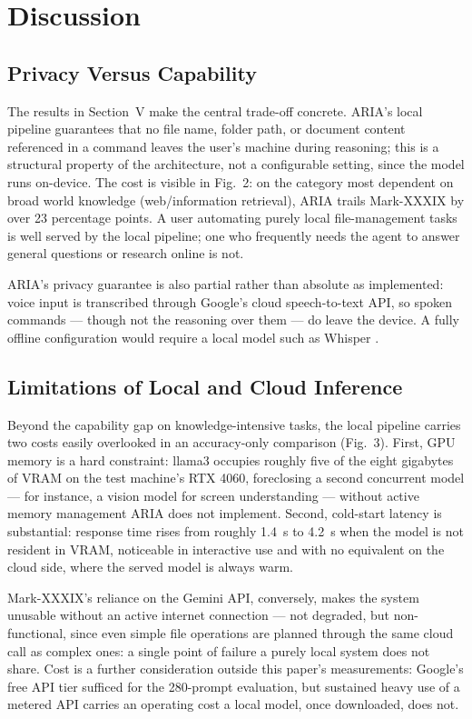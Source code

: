 \documentclass[conference]{IEEEtran}
\begin{document}
\section{Discussion}

\subsection{Privacy Versus Capability}

The results in Section~V make the central trade-off concrete. ARIA's local pipeline guarantees that no file name, folder path, or document content referenced in a command leaves the user's machine during reasoning; this is a structural property of the architecture, not a configurable setting, since the model runs on-device. The cost is visible in Fig.~2: on the category most dependent on broad world knowledge (web/information retrieval), ARIA trails Mark-XXXIX by over 23 percentage points. A user automating purely local file-management tasks is well served by the local pipeline; one who frequently needs the agent to answer general questions or research online is not.

ARIA's privacy guarantee is also partial rather than absolute as implemented: voice input is transcribed through Google's cloud speech-to-text API, so spoken commands --- though not the reasoning over them --- do leave the device. A fully offline configuration would require a local model such as Whisper \cite{ref13}.

\subsection{Limitations of Local and Cloud Inference}

Beyond the capability gap on knowledge-intensive tasks, the local pipeline carries two costs easily overlooked in an accuracy-only comparison (Fig.~3). First, GPU memory is a hard constraint: llama3 occupies roughly five of the eight gigabytes of VRAM on the test machine's RTX 4060, foreclosing a second concurrent model --- for instance, a vision model for screen understanding --- without active memory management ARIA does not implement. Second, cold-start latency is substantial: response time rises from roughly 1.4~s to 4.2~s when the model is not resident in VRAM, noticeable in interactive use and with no equivalent on the cloud side, where the served model is always warm.

Mark-XXXIX's reliance on the Gemini API, conversely, makes the system unusable without an active internet connection --- not degraded, but non-functional, since even simple file operations are planned through the same cloud call as complex ones: a single point of failure a purely local system does not share. Cost is a further consideration outside this paper's measurements: Google's free API tier sufficed for the 280-prompt evaluation, but sustained heavy use of a metered API carries an operating cost a local model, once downloaded, does not.
\end{document}
